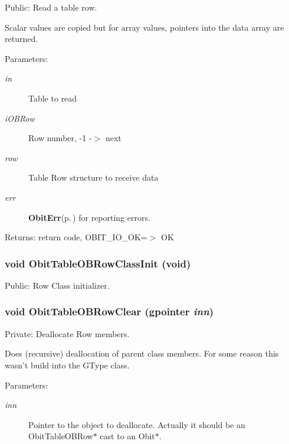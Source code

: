 Public: Read a table row. 

Scalar values are copied but for array values, pointers into the data array are returned. \begin{Desc}
\item[Parameters:]
\begin{description}
\item[{\em in}]Table to read \item[{\em i\-OBRow}]Row number, -1 -$>$ next \item[{\em row}]Table Row structure to receive data \item[{\em err}]{\bf Obit\-Err}{\rm (p.\,\pageref{structObitErr})} for reporting errors. \end{description}
\end{Desc}
\begin{Desc}
\item[Returns:]return code, OBIT\_\-IO\_\-OK=$>$ OK \end{Desc}
\subsubsection{\setlength{\rightskip}{0pt plus 5cm}void Obit\-Table\-OBRow\-Class\-Init (void)}\label{ObitTableOB_8c_a26}


Public: Row Class initializer. 

\subsubsection{\setlength{\rightskip}{0pt plus 5cm}void Obit\-Table\-OBRow\-Clear (gpointer {\em inn})}\label{ObitTableOB_8c_a7}


Private: Deallocate Row members. 

Does (recursive) deallocation of parent class members. For some reason this wasn't build into the GType class. \begin{Desc}
\item[Parameters:]
\begin{description}
\item[{\em inn}]Pointer to the object to deallocate. Actually it should be an Obit\-Table\-OBRow$\ast$ cast to an Obit$\ast$. \end{description}
\end{Desc}
